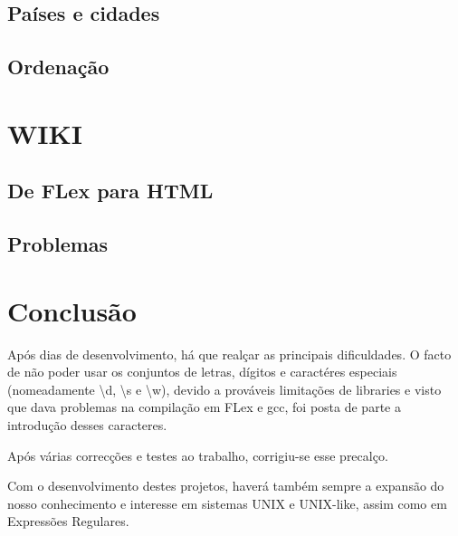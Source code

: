 \documentclass[11pt,a4paper]{report}
\begin{document}
\pagebreak
\section{Países e cidades}
\pagebreak
\section{Ordenação}


\raggedbottom
\pagebreak

\chapter{WIKI}
\section{De FLex para HTML}

\pagebreak
\section{Problemas}




\chapter{Conclusão}

Após dias de desenvolvimento, há que realçar as principais dificuldades. O facto de não poder usar os conjuntos de letras, dígitos e caractéres especiais (nomeadamente \textbackslash d, \textbackslash s e \textbackslash w), devido a prováveis limitações de libraries e visto que dava problemas na compilação em FLex e gcc, foi posta de parte a introdução desses caracteres.

Após várias correcções e testes ao trabalho, corrigiu-se esse precalço.

Com o desenvolvimento destes projetos, haverá também sempre a expansão do nosso conhecimento e interesse em sistemas UNIX e UNIX-like, assim como em Expressões Regulares.
\end{document}
